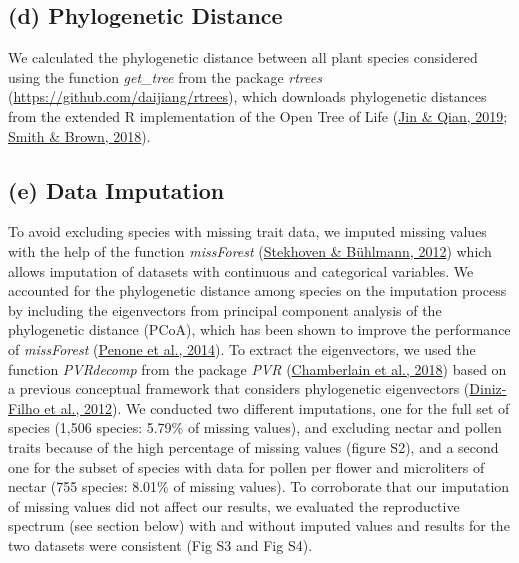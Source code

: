 \documentclass[
  12pt,
  a4paper,
]{article}
\begin{document}
\doublespacing

\hypertarget{d-phylogenetic-distance}{%
\subsection{(d) Phylogenetic Distance}\label{d-phylogenetic-distance}}

We calculated the phylogenetic distance between all plant species considered using the function \emph{get\_tree} from the package \emph{rtrees} (\url{https://github.com/daijiang/rtrees}), which downloads phylogenetic distances from the extended R implementation of the Open Tree of Life (\protect\hyperlink{ref-jin2019}{Jin \& Qian, 2019}; \protect\hyperlink{ref-smith2018}{Smith \& Brown, 2018}).

\hypertarget{e-data-imputation}{%
\subsection{(e) Data Imputation}\label{e-data-imputation}}

To avoid excluding species with missing trait data, we imputed missing values with the help of the function \emph{missForest} (\protect\hyperlink{ref-stekhoven2012}{Stekhoven \& Bühlmann, 2012}) which allows imputation of datasets with continuous and categorical variables. We accounted for the phylogenetic distance among species on the imputation process by including the eigenvectors from principal component analysis of the phylogenetic distance (PCoA), which has been shown to improve the performance of \emph{missForest} (\protect\hyperlink{ref-penone2014}{Penone et al., 2014}). To extract the eigenvectors, we used the function \emph{PVRdecomp} from the package \emph{PVR} (\protect\hyperlink{ref-santos2018}{Chamberlain et al., 2018}) based on a previous conceptual framework that considers phylogenetic eigenvectors (\protect\hyperlink{ref-diniz-filho2012}{Diniz-Filho et al., 2012}). We conducted two different imputations, one for the full set of species (1,506 species: 5.79\% of missing values), and excluding nectar and pollen traits because of the high percentage of missing values (figure S2), and a second one for the subset of species with data for pollen per flower and microliters of nectar (755 species: 8.01\% of missing values). To corroborate that our imputation of missing values did not affect our results, we evaluated the reproductive spectrum (see section below) with and without imputed values and results for the two datasets were consistent (Fig S3 and Fig S4).
\end{document}
